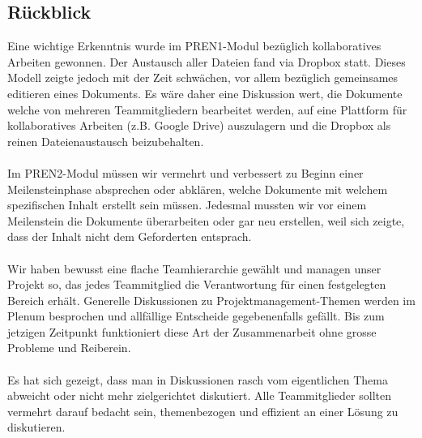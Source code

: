 \subsection{Rückblick}
Eine wichtige Erkenntnis wurde im PREN1-Modul bezüglich kollaboratives Arbeiten gewonnen. Der Austausch aller Dateien fand via Dropbox statt. Dieses Modell zeigte jedoch mit der Zeit schwächen, vor allem bezüglich gemeinsames editieren eines Dokuments. Es wäre daher eine Diskussion wert, die Dokumente welche von mehreren Teammitgliedern bearbeitet werden, auf eine Plattform für kollaboratives Arbeiten (z.B. Google Drive) auszulagern und die Dropbox als reinen Dateienaustausch beizubehalten.\\
\\
Im PREN2-Modul müssen wir vermehrt und verbessert zu Beginn einer Meilensteinphase absprechen oder abklären, welche Dokumente mit welchem spezifischen Inhalt erstellt sein müssen. Jedesmal mussten wir vor einem Meilenstein die Dokumente überarbeiten oder gar neu erstellen, weil sich zeigte, dass der Inhalt nicht dem Geforderten entsprach.\\
\\
Wir haben bewusst eine flache Teamhierarchie gewählt und managen unser Projekt so, das jedes Teammitglied die Verantwortung für einen festgelegten Bereich erhält. Generelle Diskussionen zu Projektmanagement-Themen werden im Plenum besprochen und allfällige Entscheide gegebenenfalls gefällt. Bis zum jetzigen Zeitpunkt funktioniert diese Art der Zusammenarbeit ohne grosse Probleme und Reiberein. \\
\\
Es hat sich gezeigt, dass man in Diskussionen rasch vom eigentlichen Thema abweicht oder nicht mehr zielgerichtet diskutiert. Alle Teammitglieder sollten vermehrt darauf bedacht sein, themenbezogen und effizient an einer Lösung zu diskutieren.